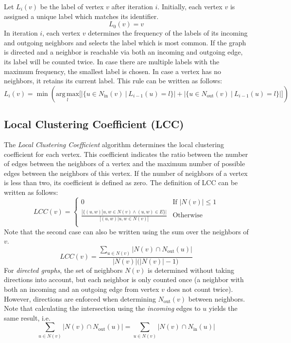Let $L_i(v)$ be the label of vertex $v$ after iteration $i$. Initially, each vertex $v$ is assigned a unique label which matches its identifier.
%
\begin{equation}
L_0(v) = v
\end{equation}
%
In iteration $i$, each vertex $v$ determines the frequency of the labels of its incoming and outgoing neighbors and selects the label which is most common.  If the graph is directed and a neighbor is reachable via both an incoming and outgoing edge, its label will be counted twice. In case there are multiple labels with the maximum frequency, the smallest label is chosen. In case a vertex has no neighbors, it retains its current label. This rule can be written as follows:
%
\begin{equation}
L_i(v) = \min \left( \underset{l}{\mathrm{arg\,max}} \Bigg[ \Big|\{ u \in N_\mathrm{in}(v)~|~L_{i-1}(u) = l \}\Big| + \Big|\{ u \in N_\mathrm{out}(v)~|~L_{i-1}(u) = l \}\Big| \Bigg] \right)
\end{equation}

\subsection{Local Clustering Coefficient (LCC)}
The \emph{Local Clustering Coefficient} algorithm determines the local clustering coefficient for each vertex. This coefficient indicates the ratio between the number of edges between the neighbors of a vertex and the maximum number of possible edges between the neighbors of this vertex. If the number of neighbors of a vertex is less than two, its coefficient is defined as zero. The definition of LCC can be written as follows:
%
\begin{equation}
LCC(v) = \begin{cases}
0 & \text{If } |N(v)| \leq 1 \\
\frac{|\{(u, w) | u, w \in N(v) \wedge (u, w) \in E\}|}
{|{(u,w) | u, w \in N(v)}|} & \text{Otherwise} \\
\end{cases}
\end{equation}
%
Note that the second case can also be written using the sum over the neighbors of $v$.
%
\begin{equation}
LCC(v) = \frac{\sum_{u \in N(v)} |N(v) \cap N_\mathrm{out}(u)|}{|N(v)| \big( |N(v)| - 1 \big)}
\end{equation}
%
For \emph{directed graphs}, the set of neighbors $N(v)$ is determined without taking directions into account, but each neighbor is only counted once (a neighbor with both an incoming and an outgoing edge from vertex $v$ does not count twice).
However, directions are enforced when determining $N_\mathrm{out}(v)$ between neighbors. Note that calculating the intersection using the \emph{incoming} edges to $u$ yields the same result, i.e.\
\begin{equation}
	\sum_{u \in N(v)} |N(v) \cap N_\mathrm{out}(u)| = 
	\sum_{u \in N(v)} |N(v) \cap N_\mathrm{in}(u)|
\end{equation}


